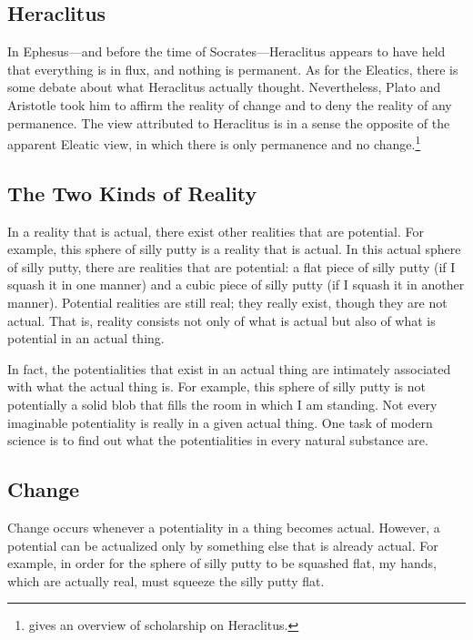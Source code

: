 \documentclass[twocolumn]{article}
\begin{document}
\subsection{Heraclitus}

In Ephesus---and before the time of Socrates---Heraclitus appears to have held
that everything is in flux, and nothing is permanent.  As for the Eleatics,
there is some debate about what Heraclitus actually thought.  Nevertheless,
Plato and Aristotle took him to affirm the reality of change and to deny the
reality of any permanence.  The view attributed to Heraclitus is in a sense the
opposite of the apparent Eleatic view, in which there is only permanence and no
change.\footnote{%
   \cite{g2015} gives an overview of scholarship on Heraclitus.%
}

\subsection{The Two Kinds of Reality}

In a reality that is actual, there exist other realities that are potential.
For example, this sphere of silly putty is a reality that is actual.  In this
actual sphere of silly putty, there are realities that are potential: a flat
piece of silly putty (if I squash it in one manner) and a cubic piece of silly
putty (if I squash it in another manner).  Potential realities are still real;
they really exist, though they are not actual.  That is, reality consists not
only of what is actual but also of what is potential in an actual thing.

In fact, the potentialities that exist in an actual thing are intimately
associated with what the actual thing is.  For example, this sphere of silly
putty is not potentially a solid blob that fills the room in which I am
standing.  Not every imaginable potentiality is really in a given actual thing.
One task of modern science is to find out what the potentialities in every
natural substance are.

\subsection{Change}

Change occurs whenever a potentiality in a thing becomes actual.  However, a
potential can be actualized only by something else that is already actual.  For
example, in order for the sphere of silly putty to be squashed flat, my hands,
which are actually real, must squeeze the silly putty flat.
\end{document}
